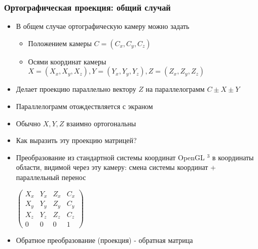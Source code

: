 \documentclass{beamer}
\begin{document}
\begin{frame}[fragile]
\frametitle{Ортографическая проекция: общий случай}
\begin{itemize}
\item В общем случае ортографическую камеру можно задать
\pause
\begin{itemize}
\item Положением камеры \begin{math}C = (C_x, C_y, C_z)\end{math}
\pause
\item Осями координат камеры \begin{math}X = (X_x, X_y, X_z), Y = (Y_x, Y_y, Y_z), Z = (Z_x, Z_y, Z_z)\end{math}
\end{itemize}
\pause
\item Делает проекцию параллельно вектору \begin{math}Z\end{math} на параллелограмм \begin{math}C \pm X \pm Y\end{math}
\item Параллелограмм отождествляется с экраном
\pause
\item Обычно \begin{math}X, Y, Z\end{math} взаимно ортогональны
\pause
\item Как выразить эту проекцию матрицей?
\pause
\item Преобразование из стандартной системы координат OpenGL \begin{math}[-1, 1]^3\end{math} в координаты области, видимой через эту камеру: смена системы координат + параллельный перенос
\begin{center}
\begin{math}
\begin{pmatrix}
X_x & Y_x & Z_x & C_x \\
X_y & Y_y & Z_y & C_y \\
X_z & Y_z & Z_z & C_z \\
0 & 0 & 0 & 1
\end{pmatrix}
\end{math}
\end{center}
\pause
\item Обратное преобразование (проекция) - обратная матрица
\end{itemize}
\end{frame}
\end{document}

